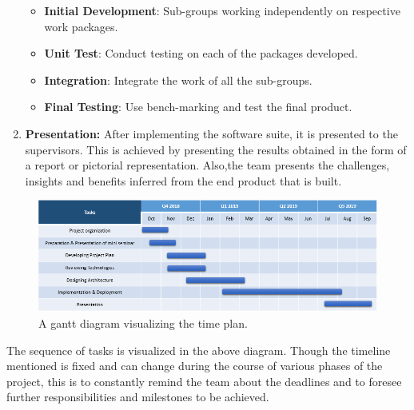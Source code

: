\begin{enumerate}
		\begin{itemize}
		\item\textbf{Initial Development}: Sub-groups working independently on respective work packages.
		\item\textbf{Unit Test}: Conduct testing on each of the packages developed.
		\item\textbf{Integration}: Integrate the work of all the sub-groups.
		\item\textbf{Final Testing}: Use bench-marking and test the final product. 	
	\end{itemize}


	\item \textbf{Presentation:}
	After implementing the software suite, it is presented to the supervisors. This is achieved by presenting the results obtained in the form of a report or pictorial representation. Also,the team presents the challenges, insights and benefits inferred from the end product that is built. 
	\end{enumerate}

\begin{figure}[h]
\centering
\includegraphics[scale=.6]{timeplan}
\caption{A gantt diagram visualizing the time plan.}
\end{figure}
The sequence of tasks is visualized in the above diagram. Though the timeline mentioned is fixed and can change during the course of various phases of the project, this is to constantly remind the team about the deadlines and to foresee further responsibilities and milestones to be achieved. 


	